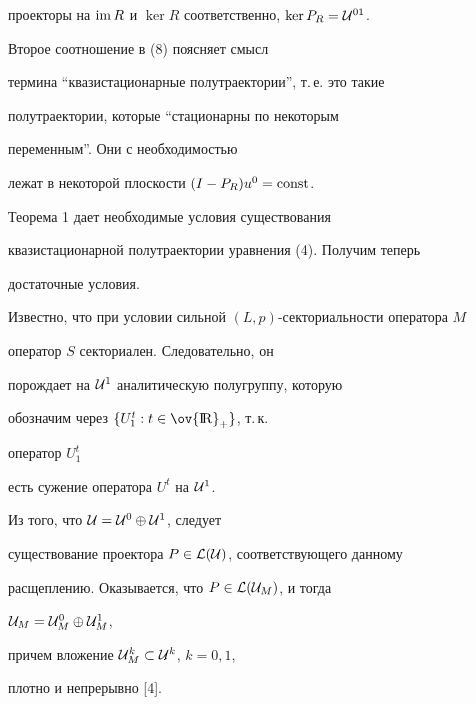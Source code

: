 проекторы на $\operatorname{im} R$ и $\ker R$ соответственно, $\ker P_R={\cal U}^{01}$.





\begin{note}


Второе соотношение в (8) поясняет смысл


термина ``квазистационарные полутраектории'', т.\,е. это такие


полутраектории, которые ``стационарны по некоторым


переменным''. Они с необходимостью


лежат в некоторой плоскости $(I-P_R)u^0=\operatorname{const}$.


\end{note}





Теорема 1 дает необходимые условия существования


квазистационарной полутраектории уравнения (4). Получим теперь


достаточные условия.





Известно, что при условии сильной $(L,p)$-секториальности оператора $M$


оператор $S$ секториален. Следовательно, он


порождает на ${\cal U}^1$ аналитическую полугруппу, которую


обозначим через $\{U_1^t:t \in \ov {\R}_+\}$, т.\,к.


оператор $U_1^t$


есть сужение оператора $U^t$ на ${\cal U}^1$.


Из того, что ${\cal U}={\cal U}^0 \oplus {\cal U}^1$, следует


существование проектора $P\in {\cal L}({\cal U})$, соответствующего данному


расщеплению. Оказывается, что $P\in {\cal L}({\cal U}_M)$, и тогда


${\cal U}_M={\cal U}^0_M \oplus {\cal U}^1_M$,


причем вложение ${\cal U}^k_M \subset {\cal U}^k$, $k=0,1$,


плотно и непрерывно [4].





